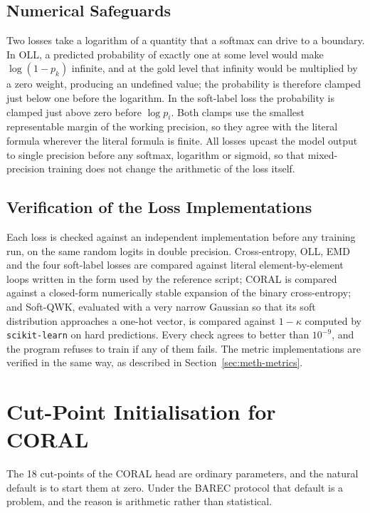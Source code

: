 \subsection{Numerical Safeguards}

Two losses take a logarithm of a quantity that a softmax can drive to a boundary. In OLL, a
predicted probability of exactly one at some level would make $\log(1-p_k)$ infinite, and at
the gold level that infinity would be multiplied by a zero weight, producing an undefined
value; the probability is therefore clamped just below one before the logarithm. In the
soft-label loss the probability is clamped just above zero before $\log p_i$. Both clamps use
the smallest representable margin of the working precision, so they agree with the literal
formula wherever the literal formula is finite. All losses upcast the model output to
single precision before any softmax, logarithm or sigmoid, so that mixed-precision training
does not change the arithmetic of the loss itself.

\subsection{Verification of the Loss Implementations}

Each loss is checked against an independent implementation before any training run, on the same
random logits in double precision. Cross-entropy, OLL, EMD and the four soft-label losses are
compared against literal element-by-element loops written in the form used by the reference
script; CORAL is compared against a closed-form numerically stable expansion of the binary
cross-entropy; and Soft-QWK, evaluated with a very narrow Gaussian so that its soft
distribution approaches a one-hot vector, is compared against $1-\kappa$ computed by
\texttt{scikit-learn} on hard predictions. Every check agrees to better than $10^{-9}$, and the
program refuses to train if any of them fails. The metric implementations are verified in the
same way, as described in Section~\ref{sec:meth-metrics}.

\section{Cut-Point Initialisation for CORAL}
\label{sec:meth-coral-init}

The 18 cut-points of the CORAL head are ordinary parameters, and the natural default is to
start them at zero. Under the BAREC protocol that default is a problem, and the reason is
arithmetic rather than statistical.

